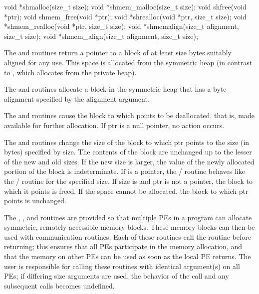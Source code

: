 \synC
void *shmalloc(size_t size);
void *shmem_malloc(size_t size);
void shfree(void *ptr);
void shmem_free(void *ptr);
void *shrealloc(void *ptr, size_t size);
void *shmem_realloc(void *ptr, size_t size);
void *shmemalign(size_t alignment, size_t size);
void *shmem_align(size_t alignment, size_t size);%

{
       The  and   routines return a pointer to a block of at least size
       bytes suitably aligned for any use.  This space is allocated from the
       symmetric heap (in contrast to , which allocates from the
       private heap).

       The   and  routines allocate a block in the symmetric heap that
       has a byte alignment specified by the alignment argument.

       The  and  routines cause the block to which  points to be
       deallocated, that is, made available for further allocation.  If ptr is
       a null pointer, no action occurs. 
              
       The   and   routines change the size of the block to which ptr
       points to the size (in bytes) specified by size.  The contents of the
       block are unchanged up to the lesser of the new and old sizes. If the
       new size is larger, the value of the newly allocated portion of the
       block is indeterminate.  
       If  is a  pointer, the / routine behaves like the / routine for the specified size.  If size  is  and ptr is not a  pointer, the block to which it points is freed. If the space cannot be allocated, the block to which ptr points is unchanged.

       The , , and  routines are provided  so that multiple \ac{PE}s in a program can allocate symmetric, remotely
       accessible memory blocks.  These memory blocks can then be used with
       \openshmem communication routines.  Each of these routines call the
        routine before returning; this ensures that all
       \ac{PE}s participate in the memory allocation, and that the memory on other
       \ac{PE}s can be used	as  soon as the local \ac{PE} returns.  The user is
       responsible for calling these routines with identical argument(s) on
       all \ac{PE}s; if differing size arguments are used, the behavior of the call and any subsequent \openshmem calls becomes undefined.
}
